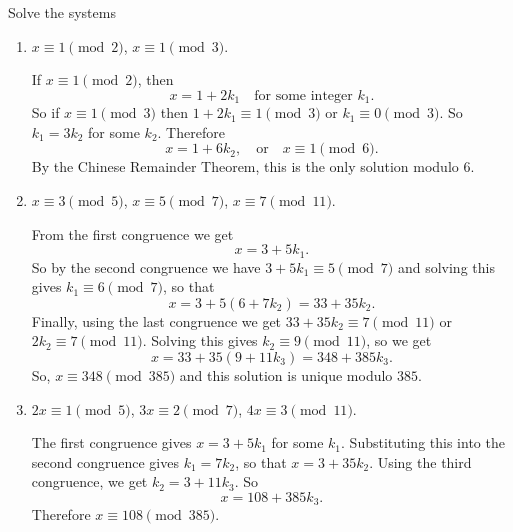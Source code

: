  Solve the systems
\begin{enumerate}
\item $x\equiv1\pmod2$, $x\equiv1\pmod3$.
  \begin{solution}
    If $x\equiv1\pmod2$, then
    \begin{equation*}
      x = 1 + 2k_1
      \quad\text{for some integer $k_1$}.
    \end{equation*}
    So if $x\equiv1\pmod3$ then $1 + 2k_1\equiv1\pmod3$ or
    $k_1\equiv0\pmod3$. So $k_1 = 3k_2$ for some $k_2$. Therefore
    \begin{equation*}
      x = 1 + 6k_2,
      \quad\text{or}\quad
      x\equiv1\pmod6.
    \end{equation*}
    By the Chinese Remainder Theorem, this is the only solution modulo
    $6$.
  \end{solution}
\item $x\equiv3\pmod5$, $x\equiv5\pmod7$, $x\equiv7\pmod{11}$.
  \begin{solution}
    From the first congruence we get
    \begin{equation*}
      x = 3 + 5k_1.
    \end{equation*}
    So by the second congruence we have $3 + 5k_1\equiv5\pmod7$ and
    solving this gives $k_1\equiv6\pmod7$, so that
    \begin{equation*}
      x = 3 + 5(6 + 7k_2) = 33 + 35k_2.
    \end{equation*}
    Finally, using the last congruence we get
    $33 + 35k_2\equiv7\pmod{11}$ or $2k_2\equiv7\pmod{11}$. Solving
    this gives $k_2\equiv9\pmod{11}$, so we get
    \begin{equation*}
      x = 33 + 35(9 + 11k_3) = 348 + 385k_3.
    \end{equation*}
    So, $x\equiv348\pmod{385}$ and this solution is unique modulo
    $385$.
  \end{solution}
\item $2x\equiv1\pmod5$, $3x\equiv2\pmod7$, $4x\equiv3\pmod{11}$.
  \begin{solution}
    The first congruence gives $x = 3 + 5k_1$ for some
    $k_1$. Substituting this into the second congruence gives
    $k_1 = 7k_2$, so that $x = 3 + 35k_2$. Using the third
    congruence, we get $k_2 = 3 + 11k_3$. So
    \begin{equation*}
      x = 108 + 385k_3.
    \end{equation*}
    Therefore $x\equiv108\pmod{385}$.
  \end{solution}
\end{enumerate}

